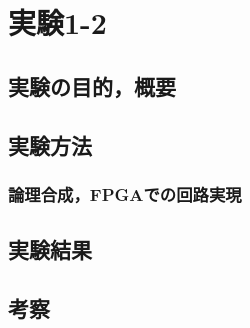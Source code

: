 \section{実験1-2}
\subsection{実験の目的，概要}

\subsection{実験方法}
\subsubsection{論理合成，FPGAでの回路実現}
\subsection{実験結果}
\subsection{考察}
